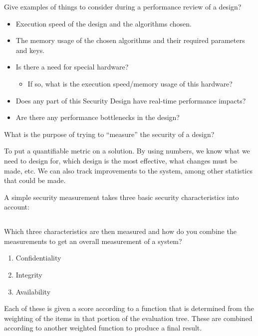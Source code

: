 \begin{questions}
\question{} Give examples of things to consider during a performance review of a design?
  \begin{solution}
    \begin{itemize}[noitemsep]
    \item Execution speed of the design and the algorithms chosen.
    \item The memory usage of the chosen algorithms and their required parameters and keys.
    \item Is there a need for special hardware?
      \begin{itemize}[noitemsep]
      \item If so, what is the execution speed/memory usage of this hardware?
      \end{itemize}
    \item Does any part of this Security Design have real-time performance impacts?
    \item Are there any performance bottlenecks in the design?
    \end{itemize}
  \end{solution}

\question{} What is the purpose of trying to ``measure'' the security of a design?
  \begin{solution}
    To put a quantifiable metric on a solution.
    By using numbers, we know what we need to design for, which design is the most effective, what changes must be made, etc.
    We can also track improvements to the system, among other statistics that could be made.
  \end{solution}

\question{} A simple security measurement takes three basic security characteristics into account:
  \begin{parts}
  \part{} Which three characteristics are then measured and how do you combine the measurements to get an overall measurement of a system?
    \begin{solution}
      \begin{enumerate}[noitemsep]
      \item Confidentiality
      \item Integrity
      \item Availability
      \end{enumerate}

      Each of these is given a score according to a function that is determined from the weighting of the items in that portion of the evaluation tree.
      These are combined according to another weighted function to produce a final result.


\end{solution}
\end{parts}
\end{questions}
